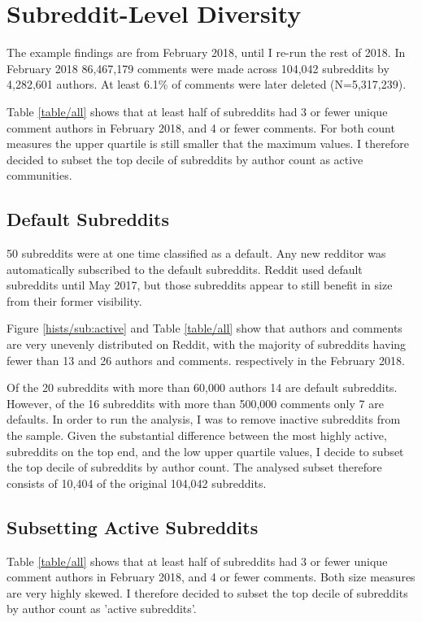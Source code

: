 \section{Subreddit-Level Diversity} \label{sub diversity}

The example findings are from February 2018, until I re-run the rest of 2018. In February 2018 86,467,179 comments were made across 104,042 subreddits by 4,282,601 authors. At least 6.1\% of comments were later deleted (N=5,317,239).

Table \ref{table/all} shows that at least half of subreddits had 3 or fewer unique comment authors in February 2018, and 4 or fewer comments. For both count measures the upper quartile is still smaller that the maximum values. I therefore decided to subset the top decile of subreddits by author count as active communities.


\subsection{Default Subreddits}
50 subreddits were at one time classified as a default. Any new redditor was automatically subscribed to the default subreddits. Reddit used default subreddits until May 2017, but those subreddits appear to still benefit in size from their former visibility.

Figure \ref{hists/sub:active} and Table \ref{table/all} show that authors and comments are very unevenly distributed on Reddit, with the majority of subreddits having fewer than 13 and 26 authors and comments. respectively in the February 2018.

Of the 20 subreddits with more than 60,000 authors 14 are default subreddits. However, of the 16 subreddits with more than 500,000 comments only 7 are defaults. In order to run the analysis, I was to remove inactive subreddits from the sample. Given the substantial difference between the most highly active, subreddits on the top end, and the low upper quartile values, I decide to subset the top decile of subreddits by author count. The analysed subset therefore consists of 10,404 of the original 104,042 subreddits.


 \label{hists/sub:active}





\subsection{Subsetting Active Subreddits}
Table \ref{table/all} shows that at least half of subreddits had 3 or fewer unique comment authors in February 2018, and 4 or fewer comments. Both size measures are very highly skewed. I therefore decided to subset the top decile of subreddits by author count as 'active subreddits'.

